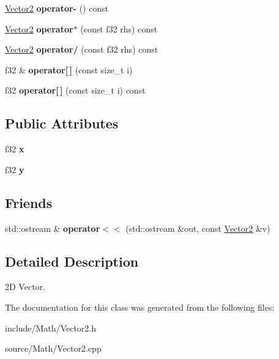 \begin{DoxyCompactItemize}
\item 
\hyperlink{classDE_1_1Vector2}{Vector2} {\bfseries operator-\/} () const \hypertarget{classDE_1_1Vector2_ad6ddc6becb375b7d2733959778996913}{}\label{classDE_1_1Vector2_ad6ddc6becb375b7d2733959778996913}

\item 
\hyperlink{classDE_1_1Vector2}{Vector2} {\bfseries operator$\ast$} (const f32 rhs) const \hypertarget{classDE_1_1Vector2_a94a8c3f5f021abc941a66cbbd2e2fb4d}{}\label{classDE_1_1Vector2_a94a8c3f5f021abc941a66cbbd2e2fb4d}

\item 
\hyperlink{classDE_1_1Vector2}{Vector2} {\bfseries operator/} (const f32 rhs) const \hypertarget{classDE_1_1Vector2_ab5d6fcceca26f69712e032dce2655a06}{}\label{classDE_1_1Vector2_ab5d6fcceca26f69712e032dce2655a06}

\item 
f32 \& {\bfseries operator\mbox{[}$\,$\mbox{]}} (const size\+\_\+t i)\hypertarget{classDE_1_1Vector2_a3e871c7158f7a2063703488946de0a36}{}\label{classDE_1_1Vector2_a3e871c7158f7a2063703488946de0a36}

\item 
f32 {\bfseries operator\mbox{[}$\,$\mbox{]}} (const size\+\_\+t i) const \hypertarget{classDE_1_1Vector2_a8bf774fcd40e258a877b1bd2fbd98907}{}\label{classDE_1_1Vector2_a8bf774fcd40e258a877b1bd2fbd98907}

\end{DoxyCompactItemize}
\subsection*{Public Attributes}
\begin{DoxyCompactItemize}
\item 
f32 {\bfseries x}\hypertarget{classDE_1_1Vector2_a44ea79b12c321152c3b510bfcaad9118}{}\label{classDE_1_1Vector2_a44ea79b12c321152c3b510bfcaad9118}

\item 
f32 {\bfseries y}\hypertarget{classDE_1_1Vector2_a6701280d6402fdf8c8e2149267c60776}{}\label{classDE_1_1Vector2_a6701280d6402fdf8c8e2149267c60776}

\end{DoxyCompactItemize}
\subsection*{Friends}
\begin{DoxyCompactItemize}
\item 
std\+::ostream \& {\bfseries operator$<$$<$} (std\+::ostream \&out, const \hyperlink{classDE_1_1Vector2}{Vector2} \&v)\hypertarget{classDE_1_1Vector2_a077027eaf020d591b263437d2949c850}{}\label{classDE_1_1Vector2_a077027eaf020d591b263437d2949c850}

\end{DoxyCompactItemize}


\subsection{Detailed Description}
2D Vector. 

The documentation for this class was generated from the following files\+:\begin{DoxyCompactItemize}
\item 
include/\+Math/Vector2.\+h\item 
source/\+Math/Vector2.\+cpp\end{DoxyCompactItemize}
